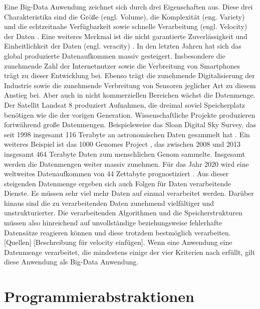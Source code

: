 Eine Big-Data Anwendung zeichnet sich durch drei Eigenschaften aus. Diese drei Charakteristika sind die Größe (engl. Volume), die Komplexität (eng. Variety) und die echtzeitnahe Verfügbarkeit sowie schnelle Verarbeitung (engl. Velocity) der Daten \cite{Laney2001}. Eine weiteres Merkmal ist die nicht garantierte Zuverlässigkeit und Einheitlichkeit der Daten (engl. veracity) \cite{Zikopoulos2012}. 
In den letzten Jahren hat sich das global produzierte Datenaufkommen massiv gesteigert. Insbesondere die zunehmende Zahl der Internetnutzer sowie die Verbreitung von Smartphones trägt zu dieser Entwicklung bei. Ebenso trägt die zunehmende Digitalisierung der Industrie sowie die zunehmende Verbreitung von Sensoren jeglicher Art zu diesem Anstieg bei. Aber auch in nicht kommerziellen Bereichen wächst die Datenmenge. Der Satellit Landsat 8 produziert Aufnahmen, die dreimal soviel Speicherplatz benötigen wie die der vorigen Generation. Wissenschaftliche Projekte produzieren fortwährend große Datenmengen. Beispielsweise das Sloan Digital Sky Survey, das seit 1998 insgesamt 116 Terabyte an astronomischen Daten gesammelt hat \cite{York2000, Alam2015}. Ein weiteres Beispiel ist das 1000 Genomes Project \cite{Baker2010}, das zwischen 2008 und 2013 insgesamt 464 Terabyte Daten zum menschlichen Genom sammelte. Insgesamt werden die Datenmengen weiter massiv zunehmen. Für das Jahr 2020 wird eine weltweites Datenaufkommen von 44 Zettabyte prognostiziert \cite{EMC2014}. Aus dieser steigenden Datenmenge ergeben sich auch Folgen für Daten verarbeitende Dienste. Es müssen sehr viel mehr Daten auf einmal verarbeitet werden. Darüber hinaus sind die zu verarbeitenden Daten zunehmend vielfältiger und unstrukturierter. Die verarbeitenden Algorithmen und die Speicherstrukturen müssen also hinreichend auf unvollständige beziehungsweise fehlerhafte Datensätze reagieren können und diese trotzdem bestmöglich verarbeiten. [Quellen] [Beschreibung für velocity einfügen].
Wenn eine Anwendung eine Datenmenge verarbeitet, die mindestens einige der vier Kriterien nach \cite{Laney2001} erfüllt, gilt diese Anwendung als Big-Data Anwendung. 




\section{Programmierabstraktionen}
